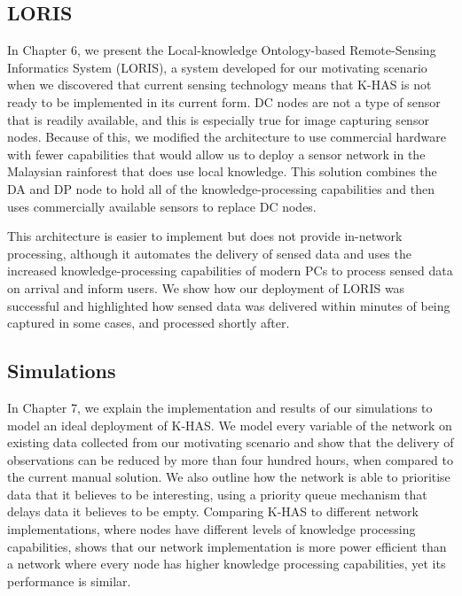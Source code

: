 \subsection{LORIS}
In Chapter 6, we present the Local-knowledge Ontology-based Remote-Sensing Informatics System (LORIS), a system developed for our motivating scenario when we discovered that current sensing technology means that K-HAS is not ready to be implemented in its current form. DC nodes are not a type of sensor that is readily available, and this is especially true for image capturing sensor nodes. Because of this, we modified the architecture to use commercial hardware with fewer capabilities that would allow us to deploy a sensor network in the Malaysian rainforest that does use local knowledge. This solution combines the DA and DP node to hold all of the knowledge-processing capabilities and then uses commercially available sensors to replace DC nodes. 

This architecture is easier to implement but does not provide in-network processing, although it automates the delivery of sensed data and uses the increased knowledge-processing capabilities of modern PCs to process sensed data on arrival and inform users. We show how our deployment of LORIS was successful and highlighted how sensed data was delivered within minutes of being captured in some cases, and processed shortly after. 
\subsection{Simulations}
In Chapter 7, we explain the implementation and results of our simulations to model an ideal deployment of K-HAS. We model every variable of the network on existing data collected from our motivating scenario and show that the delivery of observations can be reduced by more than four hundred hours, when compared to the current manual solution. We also outline how the network is able to prioritise data that it believes to be interesting, using a priority queue mechanism that delays data it believes to be empty. Comparing K-HAS to different network implementations, where nodes have different levels of knowledge processing capabilities, shows that our network implementation is more power efficient than a network where every node has higher knowledge processing capabilities, yet its performance is similar.


